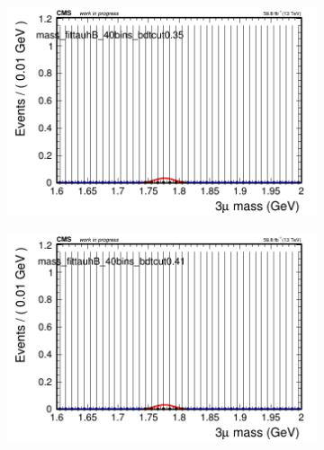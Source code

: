 \begin{figure}[H]
\begin{subfigure}{0.2\textwidth}
        \caption{}
    \end{subfigure}
    \begin{subfigure}{0.2\textwidth}
        \includegraphics[width=\textwidth]{power_law/plots/tauhB/massfit_tauhB_40bins_bdtcut0.35.png}
        \caption{}
    \end{subfigure}
    \begin{subfigure}{0.2\textwidth}
        \includegraphics[width=\textwidth]{power_law/plots/tauhB/massfit_tauhB_40bins_bdtcut0.41.png}
        \caption{}
    \end{subfigure}
    \begin{subfigure}{0.2\textwidth}

\end{subfigure}
\end{figure}
